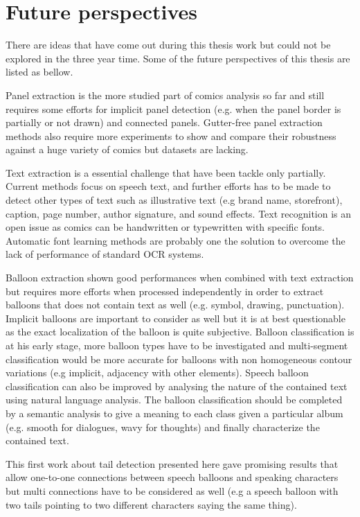 \section{Future perspectives}
\label{conclusions:perspectives}

There are ideas that have come out during this thesis work but could not be explored in the three year time.
Some of the future perspectives of this thesis are listed as bellow.

Panel extraction is the more studied part of comics analysis so far and still requires some efforts for implicit panel detection (e.g. when the panel border is partially or not drawn) and connected panels.
Gutter-free panel extraction methods also require more experiments to show and compare their robustness against a huge variety of comics but datasets are lacking.

Text extraction is a essential challenge that have been tackle only partially.
Current methods focus on speech text, and further efforts has to be made to detect other types of text such as illustrative text (e.g brand name, storefront), caption, page number, author signature, and sound effects.
Text recognition is an open issue as comics can be handwritten or typewritten with specific fonts.
Automatic font learning methods are probably one the solution to overcome the lack of performance of standard OCR systems. 

Balloon extraction shown good performances when combined with text extraction but requires more efforts when processed independently in order to extract balloons that does not contain text as well (e.g. symbol, drawing, punctuation).
Implicit balloons are important to consider as well but it is at best questionable as the exact localization of the balloon is quite subjective.
Balloon classification is at his early stage, more balloon types have to be investigated and multi-segment classification would be more accurate for balloons with non homogeneous contour variations (e.g implicit, adjacency with other elements). 
Speech balloon classification can also be improved by analysing the nature of the contained text using natural language analysis.
The balloon classification should be completed by a semantic analysis to give a meaning to each class given a particular album (e.g. smooth for dialogues, wavy for thoughts) and finally characterize the contained text.

This first work about tail detection presented here gave promising results that allow one-to-one connections between speech balloons and speaking characters but multi connections have to be considered as well (e.g a speech balloon with two tails pointing to two different characters saying the same thing).


